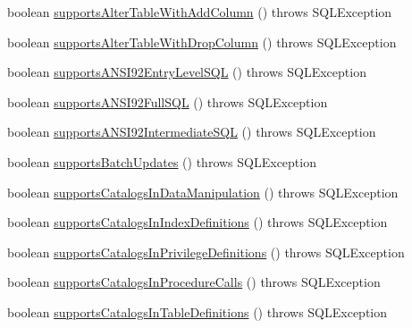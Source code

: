 \begin{DoxyCompactItemize}
\item 
boolean \mbox{\hyperlink{classcom_1_1mysql_1_1cj_1_1jdbc_1_1_database_meta_data_a94604413083173d8d191bd89e6383594}{supports\+Alter\+Table\+With\+Add\+Column}} ()  throws S\+Q\+L\+Exception 
\item 
boolean \mbox{\hyperlink{classcom_1_1mysql_1_1cj_1_1jdbc_1_1_database_meta_data_ab6e5acfa92dcb892a19cae3f54261461}{supports\+Alter\+Table\+With\+Drop\+Column}} ()  throws S\+Q\+L\+Exception 
\item 
boolean \mbox{\hyperlink{classcom_1_1mysql_1_1cj_1_1jdbc_1_1_database_meta_data_a34b29fe8f01d78623b42410f19f1110f}{supports\+A\+N\+S\+I92\+Entry\+Level\+S\+QL}} ()  throws S\+Q\+L\+Exception 
\item 
boolean \mbox{\hyperlink{classcom_1_1mysql_1_1cj_1_1jdbc_1_1_database_meta_data_a76db37b57dc6a13d073fe31933307379}{supports\+A\+N\+S\+I92\+Full\+S\+QL}} ()  throws S\+Q\+L\+Exception 
\item 
boolean \mbox{\hyperlink{classcom_1_1mysql_1_1cj_1_1jdbc_1_1_database_meta_data_a5229b0ed9296ddda4258011ae91ce66f}{supports\+A\+N\+S\+I92\+Intermediate\+S\+QL}} ()  throws S\+Q\+L\+Exception 
\item 
boolean \mbox{\hyperlink{classcom_1_1mysql_1_1cj_1_1jdbc_1_1_database_meta_data_a041b9176d3917e85a93b3b3b5948c56d}{supports\+Batch\+Updates}} ()  throws S\+Q\+L\+Exception 
\item 
boolean \mbox{\hyperlink{classcom_1_1mysql_1_1cj_1_1jdbc_1_1_database_meta_data_a4109a9f9e7ab66587ac396b2283fc056}{supports\+Catalogs\+In\+Data\+Manipulation}} ()  throws S\+Q\+L\+Exception 
\item 
boolean \mbox{\hyperlink{classcom_1_1mysql_1_1cj_1_1jdbc_1_1_database_meta_data_ad7ef9e76b46b628b341502e856bf7cae}{supports\+Catalogs\+In\+Index\+Definitions}} ()  throws S\+Q\+L\+Exception 
\item 
boolean \mbox{\hyperlink{classcom_1_1mysql_1_1cj_1_1jdbc_1_1_database_meta_data_acee80a8f185e02074a5c218e8260ecbe}{supports\+Catalogs\+In\+Privilege\+Definitions}} ()  throws S\+Q\+L\+Exception 
\item 
boolean \mbox{\hyperlink{classcom_1_1mysql_1_1cj_1_1jdbc_1_1_database_meta_data_a9246ab9246c1722116c8003efd6d3d31}{supports\+Catalogs\+In\+Procedure\+Calls}} ()  throws S\+Q\+L\+Exception 
\item 
boolean \mbox{\hyperlink{classcom_1_1mysql_1_1cj_1_1jdbc_1_1_database_meta_data_adc723857f7f9a48c5f4257126a8c1534}{supports\+Catalogs\+In\+Table\+Definitions}} ()  throws S\+Q\+L\+Exception 
\item 

\end{DoxyCompactItemize}
